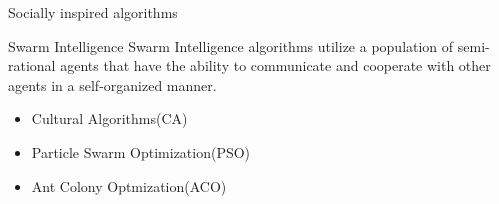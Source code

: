 \documentclass[table]{beamer}
\begin{document}
	
	\begin{frame}{Socially inspired algorithms}
		\begin{block}{Swarm Intelligence}
			\justifying
			\cite{kennedy2001swarm} Swarm Intelligence algorithms utilize a population of semi-rational agents that have the ability to communicate and cooperate with other agents in a \alert{self-organized} manner. %
		\end{block}
		\begin{block}{}
			\begin{itemize}
				\item Cultural Algorithms(CA) \cite{reynolds1994introduction}
				\item Particle Swarm Optimization(PSO) \cite{clerc2010particle}
				\item Ant Colony Optmization(ACO) \cite{dorigo2006ant}
			\end{itemize}
		\end{block}
	\end{frame}
	
\end{document}
